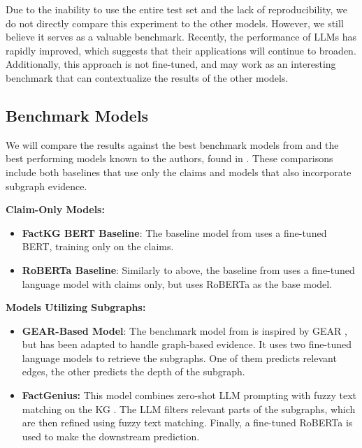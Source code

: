 \documentclass[11pt]{article}
\begin{document}
Due to the inability to use the entire test set and the lack of reproducibility, we do not directly compare this experiment to the other models. However, we still believe it serves as a valuable benchmark. Recently, the performance of LLMs has rapidly improved, which suggests that their applications will continue to broaden. Additionally, this approach is not fine-tuned, and may work as an interesting benchmark that can contextualize the results of the other models.



\subsection{Benchmark Models}

We will compare the results against the best benchmark models from \citet{kim2023factkg} and the best performing models known to the authors, found in \citet{gautam2024factgenius}. These comparisons include both baselines that use only the claims and models that also incorporate subgraph evidence.

\noindent \textbf{Claim-Only Models:}

\begin{itemize}
    \item  \textbf{FactKG BERT Baseline}: The baseline model from \citet{kim2023factkg} uses a fine-tuned BERT, training only on the claims.
    \item \textbf{RoBERTa Baseline}: Similarly to above, the baseline from \citet{gautam2024factgenius} uses a fine-tuned language model with claims only, but uses RoBERTa \citep{liu2019roberta} as the base model.
\end{itemize}

\noindent \textbf{Models Utilizing Subgraphs:}

\begin{itemize}
    \item \textbf{GEAR-Based Model}: The benchmark model from \citet{kim2023factkg} is inspired by GEAR \citep{zhou2019gear}, but has been adapted to handle graph-based evidence. It uses two fine-tuned language models to retrieve the subgraphs. One of them predicts relevant edges, the other predicts the depth of the subgraph.
    \item \textbf{FactGenius:} This model combines zero-shot LLM prompting with fuzzy text matching on the KG \citep{gautam2024factgenius}. The LLM filters relevant parts of the subgraphs, which are then refined using fuzzy text matching. Finally, a fine-tuned RoBERTa is used to make the downstream prediction.
\end{itemize}
\end{document}
